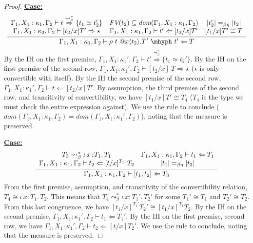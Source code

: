 \documentclass{article}
\newcommand{\abs}[4]{{#1}\, #2\! : \! #3.\, #4}
\newcommand{\tpcheck}[0]{\Leftarrow}
\newcommand{\tpsynth}[0]{\Rightarrow}
\newcommand{\tpsynthleads}[0]{\ensuremath{\overset{\leadsto_\beta^*}{\Rightarrow}}}
\newcommand{\startcase}[1]{\vspace{#1} \noindent\textbf{\underline{Case:}}}
\begin{document}
\begin{proof}
  \startcase{.2cm}
  \[
    \infer{\Gamma_1,X_1:\kappa_1,\Gamma_2 \vdash \rho\ t\ @x\langle t_2 \rangle.T'\ \mhyph\ t' \tpcheck T}
    {
      \begin{array}{ccc}
        \Gamma_1,X_1:\kappa_1,\Gamma_2 \vdash t \tpsynthleads \{t_1 \simeq t_2'\}
        & \textit{FV}(t_2) \subseteq \textit{dom}(\Gamma_1,X_1:\kappa_1,\Gamma_2)
        & |t_2'| =_{\beta\eta} |t_2|
        \\ \Gamma_1,X_1:\kappa_2,\Gamma_2 \vdash [t_2/x] T' \tpsynth \star
        & \Gamma_1,X_1:\kappa_1,\Gamma_2 \vdash t' \tpcheck [t_2/x]T'
        & [t_1/x]T' \cong T
      \end{array}
    }
  \]
  By the IH on the first premise, \(\Gamma_1,X_1:\kappa_1',\Gamma_2 \vdash t'
  \tpsynthleads \{t_1 \simeq t_2'\}\).
  By the IH on the first premise of the second row,
  \(\Gamma_1,X_1:\kappa_1',\Gamma_2 \vdash [t_2/x]\ T \tpsynth \star\)
  (\(\star\) is only convertible with itself).
  By the IH the second premise of the second row,
  \(\Gamma_1,X_1:\kappa_1',\Gamma_2 \vdash t \tpcheck [t_2/x]T'\).
  By assumption, the third premise of the second row, and transitivity of
  convertibility, we have \([t_1/x]T' \cong T_4\) (\(T_4\) is the type we must
  check the entire expression against).
  We use the rule to conclude (\(\textit{dom}(\Gamma_1,X_1:\kappa_1,\Gamma_2) =
  \textit{dom}(\Gamma_1,X_1:\kappa_1',\Gamma_2)\)), noting that the measure is
  preserved.
  
  \startcase{.2cm}
  \[
    \infer{
      \Gamma_1,X_1:\kappa_1,\Gamma_2 \vdash [ t_1 , t_2 ] \tpcheck T_3
    }{
      \begin{array}{cc}
        T_3 \leadsto_\beta^* \abs{\iota}{x}{T_1}{T_1}
        & \Gamma_1,X_1:\kappa_1,\Gamma_2 \vdash t_1 \tpcheck T_1
        \\ \Gamma_1,X_1:\kappa_1,\Gamma_2 \vdash t_2 \tpcheck [t/x]^{T_1}\ T_2
        & |t_1| =_{\beta\eta} |t_2|
      \end{array}
    }
  \]
  From the first premise, assumption, and transitivity of the convertibility
  relation, \(T_4 \cong \abs{\iota}{x}{T_1}{T_2}\).
  This means that \(T_4 \leadsto_\beta^* \abs{\iota}{x}{T_1'}{T_2'}\) for some
  \(T_1' \cong T_1\) and \(T_2' \cong T_2\).
  From this last congruence, we have \([t_1/x]^{T_1'}T_2' \cong [t_1/x]^{T_1} T_2\).
  By the IH on the second premise, \(\Gamma_1,X_1:\kappa_1',\Gamma_2 \vdash t_1
  \tpcheck T_1'\).
  By the IH on the first premise, second row, we have
  \(\Gamma_1,X_1:\kappa_1',\Gamma_2 \vdash t_2 \tpcheck [t/x]T_2'\).
  We use the rule to conclude, noting that the measure is preserved.
  

\end{proof}
\end{document}
